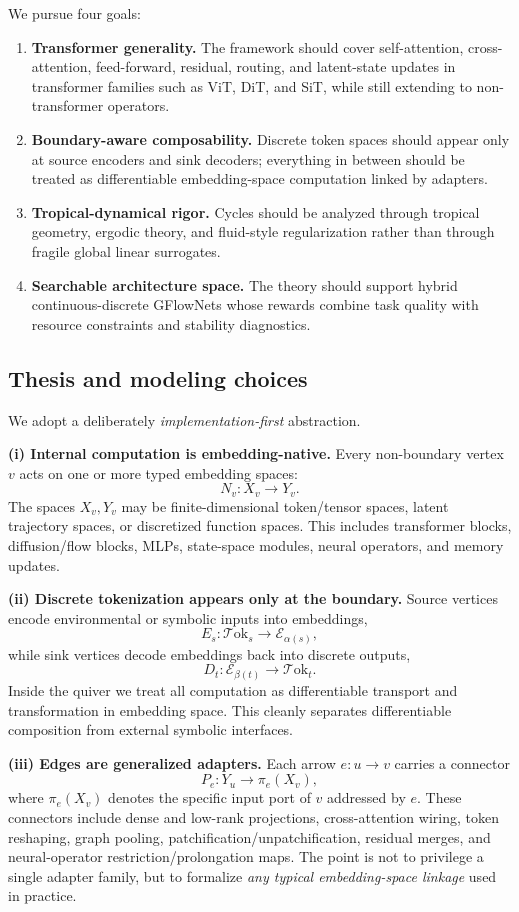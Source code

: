 \documentclass[11pt]{article}
\theoremstyle{definition}
\theoremstyle{plain}
\theoremstyle{remark}
\newcommand{\mc}[1]{\mathcal{#1}}
\newcommand{\Emb}{\mc{E}}
\newcommand{\Tok}{\mc{T}\mathrm{ok}}
\begin{document}
We pursue four goals:
\begin{enumerate}[leftmargin=2em]
\item \textbf{Transformer generality.} The framework should cover self-attention, cross-attention, feed-forward, residual, routing, and latent-state updates in transformer families such as ViT, DiT, and SiT, while still extending to non-transformer operators.
\item \textbf{Boundary-aware composability.} Discrete token spaces should appear only at source encoders and sink decoders; everything in between should be treated as differentiable embedding-space computation linked by adapters.
\item \textbf{Tropical-dynamical rigor.} Cycles should be analyzed through tropical geometry, ergodic theory, and fluid-style regularization rather than through fragile global linear surrogates.
\item \textbf{Searchable architecture space.} The theory should support hybrid continuous-discrete GFlowNets whose rewards combine task quality with resource constraints and stability diagnostics.
\end{enumerate}

\subsection{Thesis and modeling choices}
\label{sec:thesis}

We adopt a deliberately \emph{implementation-first} abstraction.

\textbf{(i) Internal computation is embedding-native.}
Every non-boundary vertex $v$ acts on one or more typed embedding spaces:
\[
N_v : X_v \longrightarrow Y_v.
\]
The spaces $X_v,Y_v$ may be finite-dimensional token/tensor spaces, latent trajectory spaces, or discretized function spaces.
This includes transformer blocks, diffusion/flow blocks, MLPs, state-space modules, neural operators, and memory updates.

\textbf{(ii) Discrete tokenization appears only at the boundary.}
Source vertices encode environmental or symbolic inputs into embeddings,
\[
E_s:\Tok_s \to \Emb_{\alpha(s)},
\]
while sink vertices decode embeddings back into discrete outputs,
\[
D_t:\Emb_{\beta(t)} \to \Tok_t.
\]
Inside the quiver we treat all computation as differentiable transport and transformation in embedding space.
This cleanly separates differentiable composition from external symbolic interfaces.

\textbf{(iii) Edges are generalized adapters.}
Each arrow $e:u\to v$ carries a connector
\[
P_e:Y_u\to \pi_e(X_v),
\]
where $\pi_e(X_v)$ denotes the specific input port of $v$ addressed by $e$.
These connectors include dense and low-rank projections, cross-attention wiring, token reshaping, graph pooling, patchification/unpatchification, residual merges, and neural-operator restriction/prolongation maps.
The point is not to privilege a single adapter family, but to formalize \emph{any typical embedding-space linkage} used in practice.
\end{document}
